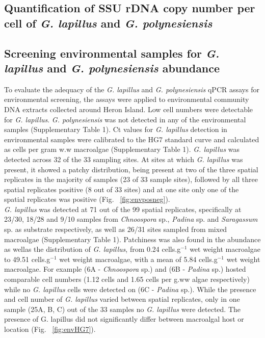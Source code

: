 \documentclass[12pt]{article}
\begin{document}
\subsection*{Quantification of SSU rDNA copy number per cell of \emph{G. lapillus} and \emph{G. polynesiensis}}

\subsection*{Screening environmental samples for \emph{G. lapillus} and \emph{G. polynesiensis} abundance}
To evaluate the adequacy of the \emph{G. lapillus} and \emph{G. polynesiensis} qPCR assays for environmental screening, the assays were applied to environmental community DNA extracts collected around Heron Island. Low cell numbers were detectable for \emph{G. lapillus}. \emph{G. polynesiensis} was not detected in any of the environmental samples (Supplementary Table 1).
Ct values for \emph{G. lapillus} detection in environmental samples were calibrated to the HG7 standard curve and calculated as cells per gram w.w macroalgae (Supplementary Table 1). 
\emph{G. lapillus} was detected across 32 of the 33 sampling sites. At sites at which \textit{G. lapillus} was present, it showed a patchy distribution, being present at two of the three spatial replicates in the majority of samples (23 of 33 sample sites), followed by all three spatial replicates positive (8 out of 33 sites) and at one site only one of the spatial replicates was positive (Fig. ~\ref{fig:envposneg}). \\
\emph{G. lapillus} was detected at 71 out of the 99 spatial replicates, specifically at 23/30, 18/28 and 9/10 samples from \emph{Chnoospora} sp., \emph{Padina} sp. and \emph{Saragassum} sp. as substrate respectively, as well as 26/31 sites sampled from mixed macroalgae (Supplementary Table 1).
Patchiness was also found in the abundance as wellas the distribution of 
\emph{G. lapillus}, from 0.24 cells.g$^{-1}$ wet weight macroalgae to 49.51 cells.g$^{-1}$ wet weight macroalgae, with a mean of 5.84 cells.g$^{-1}$ wet weight macroalgae. For example (6A - \emph{Chnoospora} sp.) and (6B - \emph{Padina} sp.) hosted comparable cell numbers (1.12 cells and 1.65 cells per g.ww algae respectively) while no \emph{G. lapillus} cells were detected on (6C - \emph{Padina} sp.). While the presence and cell number of \emph{G. lapillus} varied between spatial replicates, only in one sample (25A, B, C) out of the 33 samples no \emph{G. lapillus} were detected. The presence of G. lapillus did not significantly differ between macroalgal host or location (Fig. ~\ref{fig:envHG7}). 
\end{document}
